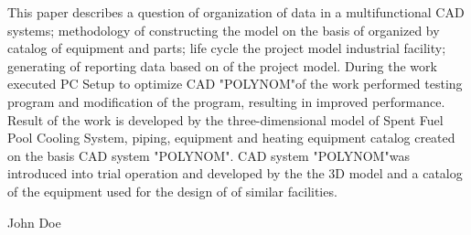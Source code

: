 \documentclass[conference]{IEEEtran}
\begin{document}
This paper describes a question of organization of data in a multifunctional CAD systems; methodology of constructing the model on the basis of organized by catalog of equipment and parts; life cycle the project model industrial facility; generating of reporting data based on of the project model. During the work executed PC Setup to optimize CAD "POLYNOM"of the work performed testing program and modification of the program, resulting in improved performance. Result of the work is developed by the three-dimensional model of Spent Fuel Pool Cooling System, piping, equipment and heating equipment catalog created on the basis CAD system "POLYNOM". CAD system "POLYNOM"was introduced into trial operation and developed by the the 3D model and a catalog of the equipment used for the design of of similar facilities.



\ifCLASSOPTIONcaptionsoff
  \newpage
\fi


\begin{IEEEbiography}{John Doe}
\blindtext
\end{IEEEbiography}
\end{document}
